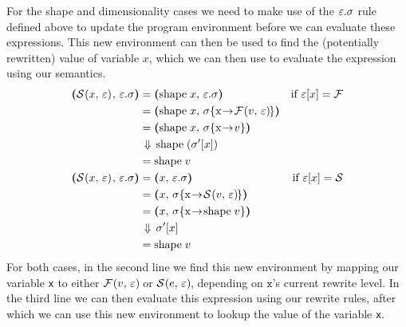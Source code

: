 \documentclass[../main.tex]{subfiles}
\begin{document}
For the shape and dimensionality cases we need to make use of the $\varepsilon.\sigma$ rule defined above to update the program environment before we can evaluate these expressions. This new environment can then be used to find the (potentially rewritten) value of variable $x$, which we can then use to evaluate the expression using our semantics.
\begin{align*}
    \sempairb[\epssig]{\reduce{S}{x}}
        &= \sempairb[\epssig]{\shpexpr{x}}
            &\text{if } \varepsilon[x] = \F \\
        &= \sempairb[\envmap{\sigma}{x}{\reduce{F}{v}}]{\shpexpr{x}} \\
        &= \sempairb[\envmap{\sigma}{x}{v}]{\shpexpr{x}} \\
        &\DownA \shpexpr{(\sigma'[x])} \\
        &= \shpexpr{v} \\
    \sempairb[\epssig]{\reduce{S}{x}}
        &= \sempairb[\epssig]{x}
            &\text{if } \varepsilon[x] = \S \\
        &= \sempairb[\envmap{\sigma}{x}{\reduce{S}{v}}]{x} \\
        &= \sempairb[\envmap{\sigma}{x}{\shpexpr{v}}]{x} \\
        &\DownA \sigma'[x] \\
        &= \shpexpr{v}
\end{align*}
%
For both cases, in the second line we find this new environment by mapping our variable \texttt{x} to either $\mathcal{F}\hspace{-1.2pt} \left( v,\, \varepsilon \right) \hspace{-1pt}$ or $\mathcal{S}\hspace{-1.2pt} \left( e,\, \varepsilon \right) \hspace{-1pt}$, depending on $\texttt{x}$'s current rewrite level.
In the third line we can then evaluate this expression using our rewrite rules, after which we can use this new environment to lookup the value of the variable \texttt{x}.
\end{document}
